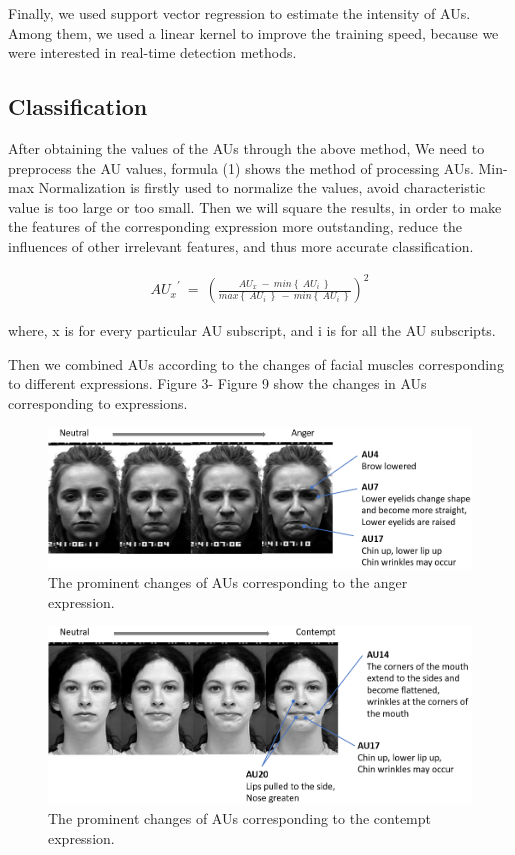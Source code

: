 \documentclass[10pt, conference, compsocconf]{IEEEtran}
\begin{document}
Finally, we used support vector regression to estimate the intensity of AUs. Among them, we used a linear kernel to improve the training speed, because we were interested in real-time detection methods.

\subsection{Classification}
\par After obtaining the values of the AUs through the above method, We need to preprocess the AU values, formula (1) shows the method of processing AUs. Min-max Normalization is firstly used to normalize the values, avoid characteristic value is too large or too small. Then we will square the results, in order to make the features of the corresponding expression more outstanding, reduce the influences of other irrelevant features, and thus more accurate classification.

\begin{equation}\label{eqn:1}
\begin{split}
\displaystyle {AU_x}^{'} \ =\ \left(  \frac{AU_x\ -\ min\left\{\ AU_i\ \right\}} {max\left\{\ AU_i\ \right\}\ -\ min\left\{\ AU_i\ \right\}}\right)^2
\end{split}
\end{equation}
\par where, x is for every particular AU subscript, and i is for all the AU subscripts.
\par Then we combined AUs according to the changes of facial muscles corresponding to different expressions. Figure 3- Figure 9 show the changes in AUs corresponding to expressions.

\begin{figure}[h]
	\centering
	\includegraphics[width=\linewidth]{AUexpression/anger}
	\caption{The prominent changes of AUs corresponding to the anger expression.}
\end{figure}
\begin{figure}[h]
	\centering
	\includegraphics[width=\linewidth]{AUexpression/contempt}
	\caption{The prominent changes of AUs corresponding to the contempt expression.}
\end{figure}
\end{document}
